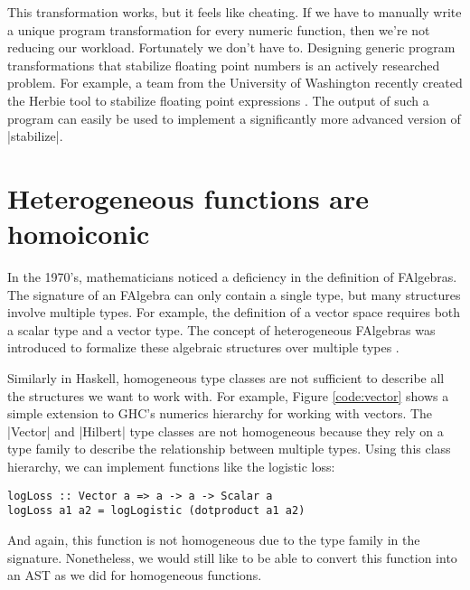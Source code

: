 \documentclass[preprint]{sigplanconf}
\theoremstyle{definition}
\begin{document}
This transformation works, but it feels like cheating.
If we have to manually write a unique program transformation for every numeric function,
then we're not reducing our workload.
Fortunately we don't have to.
Designing generic program transformations that stabilize floating point numbers is an actively researched problem.
For example, a team from the University of Washington recently created the Herbie tool to stabilize floating point expressions \cite{panchekha2015automatically}.
The output of such a program can easily be used to implement a significantly more advanced version of |stabilize|.

\section{Heterogeneous functions are homoiconic}

In the 1970's, mathematicians noticed a deficiency in the definition of FAlgebras.
The signature of an FAlgebra can only contain a single type,
but many structures involve multiple types.
For example, the definition of a vector space requires both a scalar type and a vector type.
The concept of heterogeneous FAlgebras was introduced to formalize these algebraic structures over multiple types \cite{birkhoff1970heterogeneous}.

Similarly in Haskell, homogeneous type classes are not sufficient to describe all the structures we want to work with.
For example, Figure \ref{code:vector} shows a simple extension to GHC's numerics hierarchy for working with vectors.
The |Vector| and |Hilbert| type classes are not homogeneous because they rely on a type family to describe the relationship between multiple types.
Using this class hierarchy, we can implement functions like the logistic loss:
\begin{lstlisting}
logLoss :: Vector a => a -> a -> Scalar a
logLoss a1 a2 = logLogistic (dotproduct a1 a2)
\end{lstlisting}
And again, this function is not homogeneous due to the type family in the signature.
Nonetheless, we would still like to be able to convert this function into an AST as we did for homogeneous functions.
\end{document}
